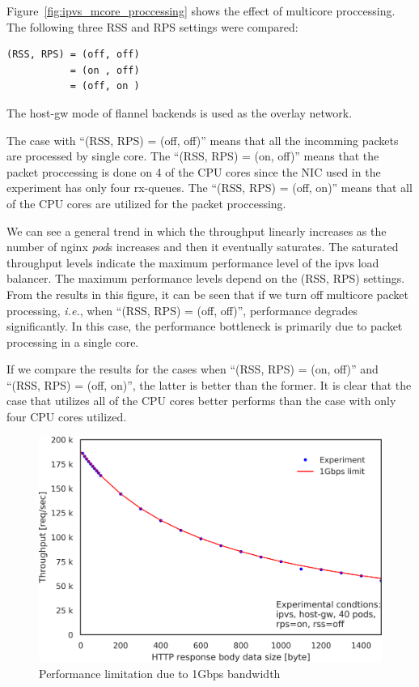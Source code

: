Figure~\ref{fig:ipvs_mcore_proccessing} shows the effect of multicore proccessing.
The following three RSS and RPS settings were compared: 
\begin{center}
  \centering
  \begin{minipage}{0.8\columnwidth}
\begin{verbatim}
(RSS, RPS) = (off, off)
           = (on , off)
           = (off, on )
\end{verbatim}
  \end{minipage}
\end{center}
The host-gw mode of flannel backends is used as the overlay network.

The case with \enquote{(RSS, RPS) = (off, off)} means that all the incomming packets are processed by single core. 
The \enquote{(RSS, RPS) = (on, off)} means that the packet proccessing is done on 4 of the CPU cores since the NIC used in the experiment has only four rx-queues. 
The \enquote{(RSS, RPS) = (off, on)} means that all of the CPU cores are utilized for the packet proccessing.

We can see a general trend in which the throughput linearly increases as the number of nginx {\em pod}s increases and then it eventually saturates.
The saturated throughput levels indicate the maximum performance level of the ipvs load balancer.
The maximum performance levels depend on the (RSS, RPS) settings.
From the results in this figure, it can be seen that if we turn off multicore packet processing,
{\it i.e.}, when \enquote{(RSS, RPS) = (off, off)}, performance degrades significantly.
In this case, the performance bottleneck is primarily due to packet processing in a single core.

If we compare the results for the cases when \enquote{(RSS, RPS) = (on, off)} and \enquote{(RSS, RPS) = (off, on)},
the latter is better than the former.
It is clear that the case that utilizes all of the CPU cores better performs than the case with only four CPU cores utilized. 

\begin{figure}[h]
  \centering
  \includegraphics[width=0.8\columnwidth]{Figs/tp_limit_1gbps}
  \caption{Performance limitation due to 1Gbps bandwidth}
  \label{fig:performance_limitation}
\end{figure}

